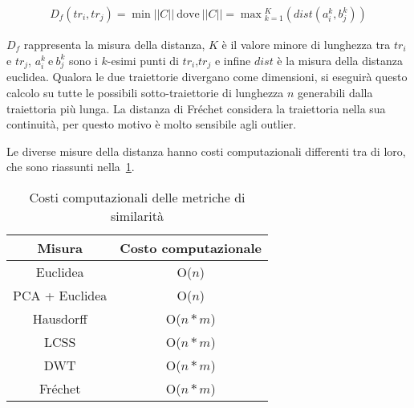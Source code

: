     \begin{equation} \label{def:frechet}
    \begin{multlined}
      {D_{f}(tr_{i}, tr_{j}) = 
      \min{||C||}}~\text{dove}~||C|| =
      \max{}_{k=1}^{K}{(dist(a_{i}^{k},
      b_{j}^{k}))}
    \end{multlined}
  \end{equation}
  
  \(D_{f}\) rappresenta la misura della distanza, \(K\)
  è il valore minore di lunghezza tra \(tr_{i}\) e \(tr_{j}\), \(a_{i}^{k}~\text{e}~
      b_{j}^{k}\) sono i \(k\)-esimi punti di \(tr_{i} \text{,} tr_{j}\) e infine \(dist\) è la misura della distanza euclidea.
  Qualora le due traiettorie divergano come dimensioni, si eseguirà questo calcolo su tutte le possibili sotto-traiettorie di lunghezza \(n\) generabili
  dalla traiettoria più lunga.
  La distanza di Fréchet considera la traiettoria nella sua continuità, per questo motivo è molto sensibile agli outlier.
  
Le diverse misure della distanza hanno costi computazionali differenti tra di loro, che sono riassunti nella~\cref{tab:metric-cost}. 

\begin{table}[H]
    \centering
   \begin{tabular}{||c c||}
 \hline
 Misura & Costo computazionale \\ [0.5ex] 
 \hline\hline
 Euclidea & O(\(n\)) \\ 
 \hline
  PCA + Euclidea & O(\(n\)) \\ 
 \hline
  Hausdorff & O(\(n*m\)) \\ 
 \hline
 LCSS & O(\(n*m\)) \\ 
 \hline
 DWT & O(\(n*m\)) \\ 
 \hline
 Fréchet & O(\(n*m\)) \\ 
 \hline
\end{tabular}
    \caption{Costi computazionali delle metriche di similarità}
    \label{tab:metric-cost}
\end{table}

\begin{center}

\end{center}
